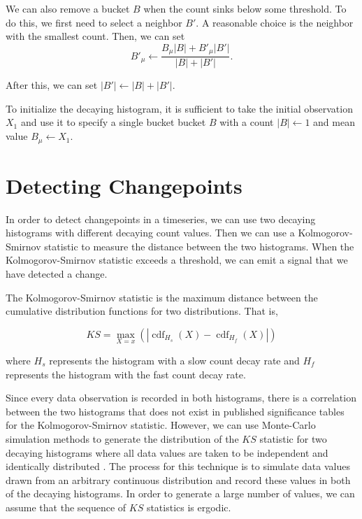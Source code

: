 \documentclass{sig-alternate}
\DeclareMathOperator{\cdf}{cdf}
\begin{document}
    We can also remove a bucket $B$ when the count sinks below some threshold.
    To do this, we first need to select a neighbor $B'$. A reasonable choice is
    the neighbor with the smallest count. Then, we can set
    \begin{displaymath}
        B'_{\mu} \leftarrow \frac{B_{\mu} |B| + B'_{\mu} |B'|}{|B| + |B'|}.
    \end{displaymath}

    After this, we can set $|B'| \leftarrow |B| + |B'|$.

    To initialize the decaying histogram, it is sufficient to take the initial
    observation $X_1$ and use it to specify a single bucket
    bucket $B$ with a count $|B| \leftarrow 1$ and mean value $B_{\mu}
    \leftarrow X_1$.

\section{Detecting Changepoints}
    In order to detect changepoints in a timeseries, we can use two decaying
    histograms with different decaying count values. Then we can use a
    Kolmogorov-Smirnov statistic to measure the distance between the two
    histograms. When the Kolmogorov-Smirnov statistic exceeds a threshold, we
    can emit a signal that we have detected a change.

    The Kolmogorov-Smirnov statistic is the maximum distance between the
    cumulative distribution functions for two distributions. That is,

    \begin{displaymath}
        KS = \max_{X = x}(|\cdf_{H_s}(X) - \cdf_{H_f}(X)|)
    \end{displaymath}

    where $H_s$ represents the histogram with a slow count decay rate and
    $H_f$ represents the histogram with the fast count decay rate.

    Since every data observation is recorded in both histograms, there is a
    correlation between the two histograms that does not exist in published
    significance tables for the Kolmogorov-Smirnov statistic. However, we can
    use Monte-Carlo simulation methods to generate the distribution of the $KS$
    statistic for two decaying histograms where all data values are taken to be
    independent and identically distributed \cite{robert2005monte}. The process
    for this technique is to simulate data values drawn from an arbitrary
    continuous distribution and record these values in both of the decaying
    histograms. In order to generate a large number of values, we can assume
    that the sequence of $KS$ statistics is ergodic.
\end{document}
